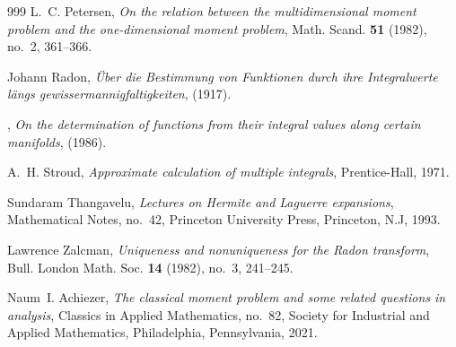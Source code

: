 \begin{thebibliography}{999}
L.~C. Petersen, \emph{On the relation between the multidimensional moment problem and the one-dimensional moment problem}, Math. Scand. \textbf{51} (1982), no.~2, 361--366. 

Johann Radon, \emph{{\"U}ber die {B}estimmung von {F}unktionen durch ihre {I}ntegralwerte l\"angs gewissermannigfaltigkeiten},  (1917).

\bysame, \emph{On the determination of functions from their integral values along certain manifolds},  (1986).

A.~H. Stroud, \emph{Approximate calculation of multiple integrals}, Prentice-Hall, 1971.

Sundaram Thangavelu, \emph{Lectures on {{Hermite}} and {{Laguerre}} expansions}, Mathematical Notes, no.~42, Princeton University Press, Princeton, N.J, 1993.

Lawrence Zalcman, \emph{Uniqueness and nonuniqueness for the {R}adon transform}, Bull. London Math. Soc. \textbf{14} (1982), no.~3, 241--245. 

Naum~I. Achiezer, \emph{The classical moment problem and some related questions in analysis}, Classics in Applied Mathematics, no.~82, {Society for Industrial and Applied Mathematics}, Philadelphia, Pennsylvania, 2021.

\end{thebibliography}
